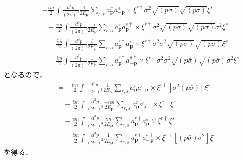 \begin{align*}
  & = - \frac{im}{2}\int \frac{d^3p}{(2\pi)^3} \frac{1}{2E_{\boldsymbol{p}}} \sum_{r, s} a_{\boldsymbol{p}}^{r} a_{-\boldsymbol{p}}^s
  \times \xi^{r\dagger} \sigma^2 \sqrt{(p\bar\sigma)} \sqrt{(p \bar\sigma)} \xi^s \\
  & \qquad - \frac{im}{2}\int \frac{d^3p}{(2\pi)^3} \frac{-i}{2E_{\boldsymbol{p}}} \sum_{r, s} a_{\boldsymbol{p}}^{r} a_{\boldsymbol{p}}^{s\dagger}
  \times \xi^{r\dagger} \sigma^2 \sqrt{(p\bar\sigma)} \sqrt{(p \sigma)} \sigma^2 \xi^s \\
  & \qquad - \frac{im}{2}\int \frac{d^3p}{(2\pi)^3} \frac{i}{2E_{\boldsymbol{p}}} \sum_{r, s} a_{\boldsymbol{p}}^{r\dagger} a_{\boldsymbol{p}}^s
  \times \xi^{r\dagger} \sigma^2 \sigma^2 \sqrt{(p\bar\sigma)} \sqrt{(p \sigma)} \xi^s \\
  & \qquad - \frac{im}{2}\int \frac{d^3p}{(2\pi)^3} \frac{1}{2E_{\boldsymbol{p}}} \sum_{r, s} a_{\boldsymbol{p}}^{r\dagger} a_{-\boldsymbol{p}}^{s\dagger}
  \times \xi^{r\dagger} \sigma^2 \sigma^2 \sqrt{(p\bar\sigma)} \sqrt{(p \bar\sigma)} \sigma^2 \xi^s
\end{align*}
となるので，
\begin{align}
  & = - \frac{im}{2}\int \frac{d^3p}{(2\pi)^3} \frac{1}{2E_{\boldsymbol{p}}} \sum_{r, s} a_{\boldsymbol{p}}^{r} a_{-\boldsymbol{p}}^s
  \times \xi^{r\dagger} \left[ \sigma^2 (p\bar\sigma) \right] \xi^s \label{prob3_4_H_3_1} \\
  & \quad - \frac{im}{2}\int \frac{d^3p}{(2\pi)^3} \frac{-im}{2E_{\boldsymbol{p}}} \sum_{r, s} a_{\boldsymbol{p}}^{r} a_{\boldsymbol{p}}^{s\dagger} \times \xi^{r\dagger} \xi^s \label{prob3_4_H_3_2} \\
  & \quad - \frac{im}{2}\int \frac{d^3p}{(2\pi)^3} \frac{im}{2E_{\boldsymbol{p}}} \sum_{r, s} a_{\boldsymbol{p}}^{r\dagger} a_{\boldsymbol{p}}^s \times \xi^{r\dagger} \xi^s \label{prob3_4_H_3_3} \\
  & \quad - \frac{im}{2}\int \frac{d^3p}{(2\pi)^3} \frac{1}{2E_{\boldsymbol{p}}} \sum_{r, s} a_{\boldsymbol{p}}^{r\dagger} a_{-\boldsymbol{p}}^{s\dagger}
  \times \xi^{r\dagger} \left[ (p\bar\sigma) \sigma^2 \right] \xi^s \label{prob3_4_H_3_4}
\end{align}
を得る．

